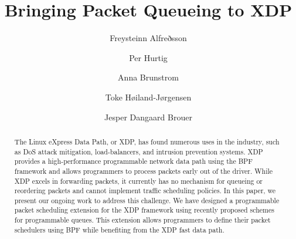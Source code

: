 \documentclass[sigconf, nonacm]{acmart}
\begin{document}
\title{Bringing Packet Queueing to XDP}

\author{Freysteinn Alfreðsson}
\author{Per Hurtig}
\author{Anna Brunstrom}

\author{Toke Høiland-Jørgensen}

\author{Jesper Dangaard Brouer}

\renewcommand{\shortauthors}{Alfreðsson, et al.}

\begin{abstract}

The Linux eXpress Data Path, or XDP, has found numerous uses in the industry, such as DoS attack mitigation, load-balancers, and intrusion prevention systems. XDP provides a high-performance programmable network data path using the BPF framework and allows programmers to process packets early out of the driver. While XDP excels in forwarding packets, it currently has no mechanism for queueing or reordering packets and cannot implement traffic scheduling policies. In this paper, we present our ongoing work to address this challenge. We have designed a programmable packet scheduling extension for the XDP framework using recently proposed schemes for programmable queues. This extension allows programmers to define their packet schedulers using BPF while benefiting from the XDP fast data path.

\end{abstract}
\end{document}
